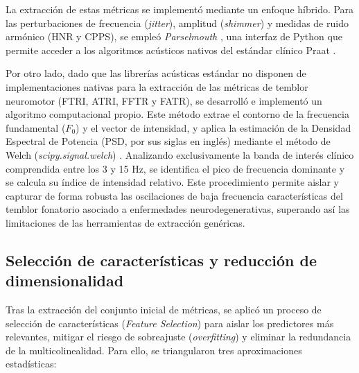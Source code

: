             La extracción de estas métricas se implementó mediante un enfoque híbrido. Para las perturbaciones de frecuencia (\textit{jitter}), amplitud (\textit{shimmer}) y medidas de ruido armónico (HNR y CPPS), se empleó \textit{Parselmouth} \cite{parselmouth}, una interfaz de Python que permite acceder a los algoritmos acústicos nativos del estándar clínico Praat \cite{praat2018}. 

            Por otro lado, dado que las librerías acústicas estándar no disponen de implementaciones nativas para la extracción de las métricas de temblor neuromotor (FTRI, ATRI, FFTR y FATR), se desarrolló e implementó un algoritmo computacional propio. Este método extrae el contorno de la frecuencia fundamental ($F_0$) y el vector de intensidad, y aplica la estimación de la Densidad Espectral de Potencia (PSD, por sus siglas en inglés) mediante el método de Welch (\textit{scipy.signal.welch}) \cite{welch1967}. Analizando exclusivamente la banda de interés clínico comprendida entre los 3 y 15 Hz, se identifica el pico de frecuencia dominante y se calcula su índice de intensidad relativo. Este procedimiento permite aislar y capturar de forma robusta las oscilaciones de baja frecuencia características del temblor fonatorio asociado a enfermedades neurodegenerativas, superando así las limitaciones de las herramientas de extracción genéricas.
                
        \subsection{Selección de características y reducción de dimensionalidad}

            Tras la extracción del conjunto inicial de métricas, se aplicó un proceso de selección de características (\textit{Feature Selection}) para aislar los predictores más relevantes, mitigar el riesgo de sobreajuste (\textit{overfitting}) y eliminar la redundancia de la multicolinealidad. Para ello, se triangularon tres aproximaciones estadísticas:

